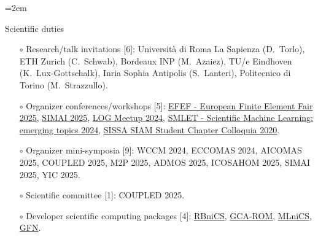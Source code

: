 \documentclass[
  usegeometry%
]{scrartcl}
\newcommand{\Description}[1]{\hangindent=2em\hangafter=0\noindent\raggedright\footnotesize{#1}\par\normalsize\vspace{1em}} %
\begin{document}
\begin{cv}{}
\newpage
\Description{{\color{cyan} Scientific duties}
\begin{itemize}
    \item[$\circ$] Research/talk invitations [6]: Università di Roma La Sapienza (D.\ Torlo), ETH Zurich (C.\ Schwab), Bordeaux INP (M.\ Azaiez), TU/e Eindhoven (K.\ Lux-Gottschalk), Inria Sophia Antipolis (S.\ Lanteri), Politecnico di Torino (M.\ Strazzullo).
    \item[$\circ$] Organizer conferences/workshops [5]: \href{https://indico.sissa.it/event/153/}{EFEF - European Finite Element Fair 2025}, \href{https://simai2025.cimne.com}{SIMAI 2025}, \href{https://sites.google.com/student.unisi.it/log24siena/home-page}{LOG Meetup 2024}, \href{https://indico.sissa.it/event/107/}{SMLET - Scientific Machine Learning: emerging topics 2024}, \href{https://www.math.sissa.it/seminar/siam-chapter-colloquia-2020}{SISSA SIAM Student Chapter Colloquia 2020}.
    \item[$\circ$] Organizer mini-symposia [9]: WCCM 2024, ECCOMAS 2024, AICOMAS 2025, COUPLED 2025, M2P 2025, ADMOS 2025, ICOSAHOM 2025, SIMAI 2025, YIC 2025.
    \item[$\circ$] Scientific committee [1]:  COUPLED 2025.
    \item[$\circ$] Developer scientific computing packages [4]: \href{https://github.com/RBniCS/RBniCS}{RBniCS}, \href{https://github.com/fpichi/gca-rom}{GCA-ROM}, \href{https://github.com/MLniCS/MLniCS}{MLniCS}, \href{https://github.com/Oisin-M/GFN}{GFN}. 

\end{itemize}}
\end{cv}
\end{document}
